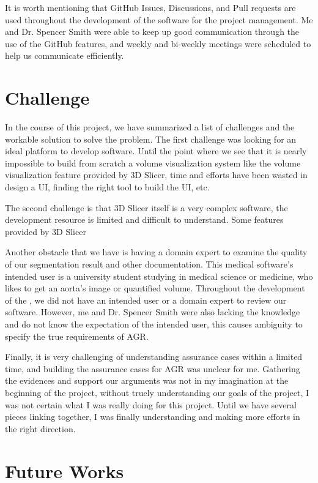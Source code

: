 It is worth mentioning that GitHub Issues, Discussions, and Pull requests are used throughout the development of the software for the project management. Me and Dr. Spencer Smith were able to keep up good communication through the use of the GitHub features, and weekly and bi-weekly meetings were scheduled to help us communicate efficiently.

\section{Challenge}\label{challenge}
In the course of this project, we have summarized a list of challenges and the workable solution to solve the problem. The first challenge was looking for an ideal platform to develop \progname{} software. Until the point where we see that it is nearly impossible to build from scratch a volume visualization system like the volume visualization feature provided by 3D Slicer, time and efforts have been wasted in design a UI, finding the right tool to build the UI, etc. 

The second challenge is that 3D Slicer itself is a very complex software, the development resource is limited and difficult to understand. Some features provided by 3D Slicer 

Another obstacle that we have is having a domain expert to examine the quality of our segmentation result and other documentation. This medical software's intended user is a university student studying in medical science or medicine, who likes to get an aorta's image or quantified volume. Throughout the development of the \progname{}, we did not have an intended user or a domain expert to review our software. However, me and Dr. Spencer Smith were also lacking the knowledge and do not know the expectation of the intended user, this causes ambiguity to specify the true requirements of AGR.

Finally, it is very challenging of understanding assurance cases within a limited time, and building the assurance cases for AGR was unclear for me. Gathering the evidences and support our arguments was not in my imagination at the beginning of the project, without truely understanding our goals of the project, I was not certain what I was really doing for this project. Until we have several pieces linking together, I was finally understanding and making more efforts in the right direction. 

\section{Future Works}\label{fw}

